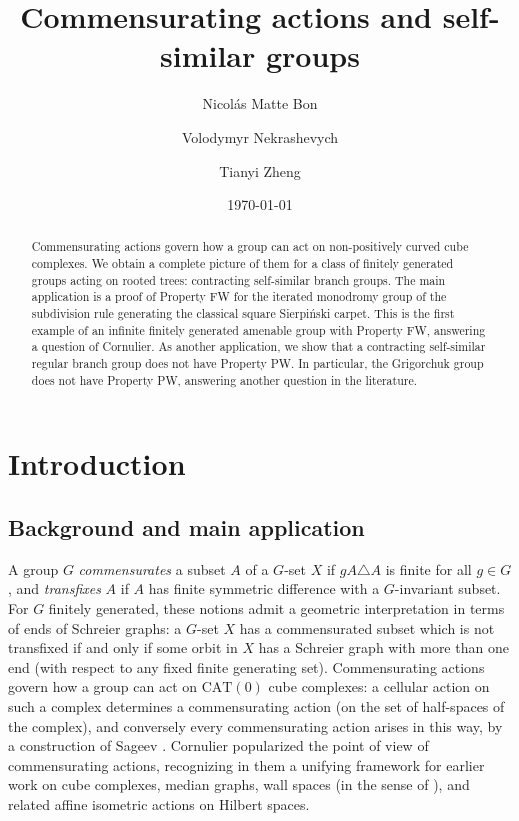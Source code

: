 \documentclass[11pt]{amsart}
\date{\today}
\title{Commensurating actions and self-similar groups}
\author{Nicol\'as Matte Bon}
\author{Volodymyr Nekrashevych}
\author{Tianyi Zheng}
\theoremstyle{definition}
\theoremstyle{plain}
\newtheorem{main thm}{Theorem}
\theoremstyle{remark}
\theoremstyle{plain}
\begin{document}
\begin{abstract} Commensurating actions govern how a group can act on non-positively curved cube complexes. We obtain a complete picture of them for a class of finitely generated groups acting on rooted trees: contracting self-similar branch groups. The main application is a proof of Property FW for the iterated monodromy group of the subdivision rule generating the classical square Sierpi\'nski carpet.  This is the first example of an infinite finitely generated amenable group with Property FW, answering a question of Cornulier. As another application, we show that a contracting self-similar regular branch group does not have Property PW. In particular, the Grigorchuk group does not have Property PW, answering another question in the literature.


 


\end{abstract}

\maketitle


\section{Introduction}

\subsection*{Background and main application} 
A group $G$ \emph{commensurates} a subset $A$ of a $G$-set $X$ if $gA\triangle A$ is finite for all $g\in G$, and \emph{transfixes} $A$ if $A$ has finite symmetric difference with a $G$-invariant subset. For $G$ finitely generated, these notions admit a geometric interpretation in terms of ends of Schreier graphs: a $G$-set $X$ has a commensurated subset which is not transfixed if and only if some orbit in $X$ has a Schreier graph with more than one end (with respect to any fixed finite generating set). Commensurating actions govern how a group can act on $\mathrm{CAT}(0)$ cube complexes: a cellular action on such a complex determines a commensurating action (on the set of half-spaces of the complex), and conversely every commensurating action arises in this way, by a construction of Sageev \cite{Sageev}. Cornulier \cite{Cor-FM, Cor-FWsurvey} popularized the point of view of commensurating actions, recognizing in them a unifying framework for earlier work on cube complexes, median graphs, wall spaces (in the sense of \cite{Hag-Pau}), and related affine isometric actions on Hilbert spaces.
\end{document}
